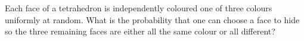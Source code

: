 Each face of a tetrahedron is independently coloured one of three colours uniformly at random. What is the probability that one can choose a face to hide so the three remaining faces are either all the same colour or all different?
